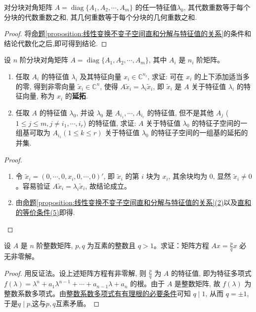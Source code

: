 \documentclass[../../main.tex]{subfiles}%
\begin{document}
\begin{corollary}\label{corollary:分块准对角矩阵的任一特征值的代数重数与几何重数}
对分块对角矩阵 $A = \operatorname{diag}\{A_1, A_2, \cdots, A_m\}$ 的任一特征值$\lambda_0$, 其代数重数等于每个分块的代数重数之和, 其几何重数等于每个分块的几何重数之和.
\end{corollary}
\begin{proof}
将\hyperref[proposition:线性变换不变子空间直和分解与特征值的关系]{命题\ref{proposition:线性变换不变子空间直和分解与特征值的关系}}的条件和结论代数化之后,即可得到结论.
\end{proof}

\begin{proposition}[特征向量的延拓]\label{proposition:特征向量的延拓}
设 $n$ 阶分块对角矩阵 $A = \operatorname{diag}\{A_1, A_2, \cdots, A_m\}$, 其中 $A_i$ 是 $n_i$ 阶矩阵。
\begin{enumerate}[(1)]
\item 任取 $A_i$ 的特征值 $\lambda_i$ 及其特征向量 $x_i \in \mathbb{C}^{n_i}$, 求证: 可在 $x_i$ 的上下添加适当多的零, 得到非零向量 $\tilde{x}_i \in \mathbb{C}^n$, 使得 $A \tilde{x}_i = \lambda_i \tilde{x}_i$, 即 $\tilde{x}_i$ 是 $A$ 关于特征值 $\lambda_i$ 的特征向量, 称为 $x_i$ 的\textbf{延拓}.

\item 任取 $A$ 的特征值 $\lambda_0$, 并设 $\lambda_0$ 是 $A_{i_1}, \cdots, A_{i_r}$ 的特征值, 但不是其他 $A_j$ ($1 \leqslant  j \leqslant  m, j \neq i_1, \cdots, i_r$) 的特征值, 求证: $A$ 关于特征值 $\lambda_0$ 的特征子空间的一组基可取为 $A_{i_1} (1 \leqslant  k \leqslant  r)$ 关于特征值 $\lambda_0$ 的特征子空间的一组基的延拓的并集.
\end{enumerate} 
\end{proposition}
\begin{proof}
\begin{enumerate}[(1)]
\item 令 $\tilde{x}_i = (0, \cdots, 0, x_i, 0, \cdots, 0)'$, 即 $\tilde{x}_i$ 的第 $i$ 块为 $x_i$, 其余块均为 $0$, 显然 $\tilde{x}_i \neq 0$。容易验证 $A \tilde{x}_i = \lambda_i \tilde{x}_i$, 故结论成立。

\item 由\hyperref[proposition:线性变换不变子空间直和分解与特征值的关系]{命题\ref{proposition:线性变换不变子空间直和分解与特征值的关系}(2)}以及\hyperref[theorem:直和的等价条件]{直和的等价条件(5)}即得.
\end{enumerate}
\end{proof}

\begin{example}
设 $A$ 是 $n$ 阶整数矩阵, $p, q$ 为互素的整数且 $q > 1$。求证：矩阵方程 $Ax = \frac{p}{q} x$ 必无非零解。
\end{example}
\begin{proof}
用反证法。设上述矩阵方程有非零解, 则 $\frac{p}{q}$ 为 $A$ 的特征值, 即为特征多项式 $f(\lambda) = \lambda^n + a_1 \lambda^{n-1} + \cdots + a_{n-1} \lambda + a_n$ 的根。由于 $A$ 是整数矩阵, 故 $f(\lambda)$ 为整数系数多项式。由\hyperref[theorem:整数系数多项式有有理根的必要条件]{整数系数多项式有有理根的必要条件}可知 $q \mid 1$, 从而 $q = \pm 1$,于是$q\mid p$,这与$p,q$互素矛盾。
\end{proof}
\end{document}
